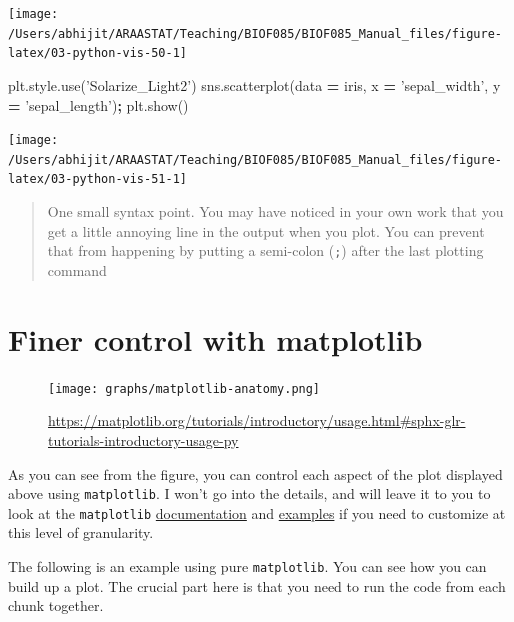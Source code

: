 \documentclass[
  letterpaper,
]{scrbook}
\newenvironment{Shaded}{\begin{snugshade}}{\end{snugshade}}
\newcommand{\NormalTok}[1]{#1}
\newcommand{\OperatorTok}[1]{\textcolor[rgb]{0.81,0.36,0.00}{\textbf{#1}}}
\newcommand{\StringTok}[1]{\textcolor[rgb]{0.31,0.60,0.02}{#1}}
\begin{document}
\begin{center}\texttt{[image: /Users/abhijit/ARAASTAT/Teaching/BIOF085/BIOF085\_Manual\_files/figure-latex/03-python-vis-50-1]} \end{center}

\begin{Shaded}
\begin{Highlighting}[]
\NormalTok{plt.style.use(}\StringTok{'Solarize_Light2'}\NormalTok{)}
\NormalTok{sns.scatterplot(data }\OperatorTok{=}\NormalTok{ iris, x }\OperatorTok{=} \StringTok{'sepal_width'}\NormalTok{, y }\OperatorTok{=} \StringTok{'sepal_length'}\NormalTok{)}\OperatorTok{;}
\NormalTok{plt.show()}
\end{Highlighting}
\end{Shaded}

\begin{center}\texttt{[image: /Users/abhijit/ARAASTAT/Teaching/BIOF085/BIOF085\_Manual\_files/figure-latex/03-python-vis-51-1]} \end{center}

\begin{quote}
One small syntax point. You may have noticed in your own work that you get a little annoying line in the output when you plot. You can prevent that from happening by putting a semi-colon (\texttt{;}) after the last plotting command
\end{quote}

\hypertarget{finer-control-with-matplotlib}{%
\section{Finer control with matplotlib}\label{finer-control-with-matplotlib}}

\begin{figure}
\centering
\texttt{[image: graphs/matplotlib-anatomy.png]}
\caption{\url{https://matplotlib.org/tutorials/introductory/usage.html\#sphx-glr-tutorials-introductory-usage-py}}
\end{figure}

As you can see from the figure, you can control each aspect of the plot displayed above using \texttt{matplotlib}. I won't go into the details, and will leave it to you to look at the \texttt{matplotlib} \href{https://matplotlib.org/contents.html}{documentation} and \href{https://matplotlib.org/gallery/index.html}{examples} if you need to customize at this level of granularity.

The following is an example using pure \texttt{matplotlib}. You can see how you can build up a plot. The crucial part here is that you need to run the code from each chunk together.
\end{document}
